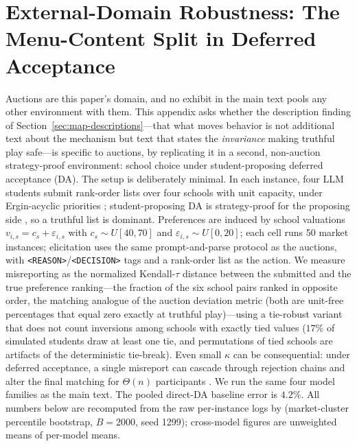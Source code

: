 \section{External-Domain Robustness: The Menu-Content Split in Deferred Acceptance}\label{app:da}

Auctions are this paper's domain, and no exhibit in the main text pools any other environment with them. This appendix asks whether the description finding of Section~\ref{sec:map-descriptions}---that what moves behavior is not additional text about the mechanism but text that states the \emph{invariance} making truthful play safe---is specific to auctions, by replicating it in a second, non-auction strategy-proof environment: school choice under student-proposing deferred acceptance (DA). The setup is deliberately minimal. In each instance, four LLM students submit rank-order lists over four schools with unit capacity, under Ergin-acyclic priorities \citep{ergin2002efficient,ashlagi2018stable}; student-proposing DA is strategy-proof for the proposing side \citep{roth1982economics}, so a truthful list is dominant. Preferences are induced by school valuations $v_{i,s} = c_s + \varepsilon_{i,s}$ with $c_s \sim U[40,70]$ and $\varepsilon_{i,s} \sim U[0,20]$; each cell runs 50 market instances; elicitation uses the same prompt-and-parse protocol as the auctions, with \texttt{<REASON>}/\texttt{<DECISION>} tags and a rank-order list as the action. We measure misreporting as the normalized Kendall-$\tau$ distance between the submitted and the true preference ranking---the fraction of the six school pairs ranked in opposite order, the matching analogue of the auction deviation metric (both are unit-free percentages that equal zero exactly at truthful play)---using a tie-robust variant that does not count inversions among schools with exactly tied values ($17\%$ of simulated students draw at least one tie, and permutations of tied schools are artifacts of the deterministic tie-break). Even small $\kappa$ can be consequential: under deferred acceptance, a single misreport can cascade through rejection chains and alter the final matching for $\Theta(n)$ participants \citep{dubins1981machiavelli}. We run the same four model families as the main text. The pooled direct-DA baseline error is $4.2\%$. All numbers below are recomputed from the raw per-instance logs by  (market-cluster percentile bootstrap, $B = 2000$, seed 1299); cross-model figures are unweighted means of per-model means.

